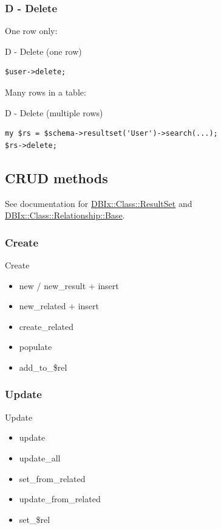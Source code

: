 \subsubsection{D - Delete}

One row only:

\begin{frame}[fragile]{D - Delete (one row)}
\begin{lstlisting}
$user->delete;
\end{lstlisting}
\end{frame}

Many rows in a table:

\begin{frame}[fragile]{D - Delete (multiple rows)}
\begin{lstlisting}
my $rs = $schema->resultset('User')->search(...);
$rs->delete;
\end{lstlisting}
\end{frame}

\subsection{CRUD methods}

See documentation for 
\href{https://metacpan.org/pod/DBIx::Class::ResultSet}{DBIx::Class::ResultSet} 
and \href{https://metacpan.org/pod/DBIx::Class::Relationship::Base}
{DBIx::Class::Relationship::Base}.

\subsubsection{Create}

\begin{frame}{Create}
\begin{itemize}
\item new / new\_result + insert
\item new\_related + insert
\item create\_related
\item populate
\item add\_to\_\$rel
\end{itemize}
\end{frame}

\subsubsection{Update}

\begin{frame}{Update}
\begin{itemize}
\item update
\item update\_all
\item set\_from\_related
\item update\_from\_related
\item set\_\$rel
\end{itemize}
\end{frame}

